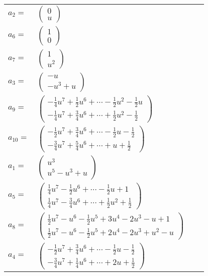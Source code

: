\documentclass[1p]{elsarticle_modified}
\theoremstyle{definition}
\begin{document}
\begin{tabular}{m{7pt} m{180pt} m{7pt} m{180pt} }
\flushright $a_{2}=$&$\begin{pmatrix}0\\u\end{pmatrix}$ \\
\flushright $a_{6}=$&$\begin{pmatrix}1\\0\end{pmatrix}$ \\
\flushright $a_{7}=$&$\begin{pmatrix}1\\u^2\end{pmatrix}$ \\
\flushright $a_{3}=$&$\begin{pmatrix}- u\\- u^3+u\end{pmatrix}$ \\
\flushright $a_{9}=$&$\begin{pmatrix}-\frac{1}{4} u^7+\frac{1}{2} u^6+\cdots-\frac{1}{2} u^2-\frac{1}{2} u\\-\frac{1}{4} u^7+\frac{3}{4} u^6+\cdots+\frac{1}{2} u^2-\frac{1}{2}\end{pmatrix}$ \\
\flushright $a_{10}=$&$\begin{pmatrix}-\frac{1}{2} u^7+\frac{3}{4} u^6+\cdots-\frac{1}{2} u-\frac{1}{2}\\-\frac{3}{4} u^7+\frac{5}{4} u^6+\cdots+u+\frac{1}{2}\end{pmatrix}$ \\
\flushright $a_{1}=$&$\begin{pmatrix}u^3\\u^5- u^3+u\end{pmatrix}$ \\
\flushright $a_{5}=$&$\begin{pmatrix}\frac{1}{4} u^7-\frac{1}{2} u^6+\cdots-\frac{1}{2} u+1\\\frac{1}{4} u^7-\frac{3}{4} u^6+\cdots+\frac{1}{2} u^2+\frac{1}{2}\end{pmatrix}$ \\
\flushright $a_{8}=$&$\begin{pmatrix}\frac{1}{2} u^7- u^6-\frac{1}{2} u^5+3 u^4-2 u^3- u+1\\\frac{1}{2} u^7- u^6-\frac{1}{2} u^5+2 u^4-2 u^3+u^2- u\end{pmatrix}$ \\
\flushright $a_{4}=$&$\begin{pmatrix}-\frac{1}{2} u^7+\frac{3}{4} u^6+\cdots-\frac{1}{2} u-\frac{1}{2}\\-\frac{3}{4} u^7+\frac{1}{4} u^6+\cdots+2 u+\frac{1}{2}\end{pmatrix}$ \\

\end{tabular}
\end{document}
